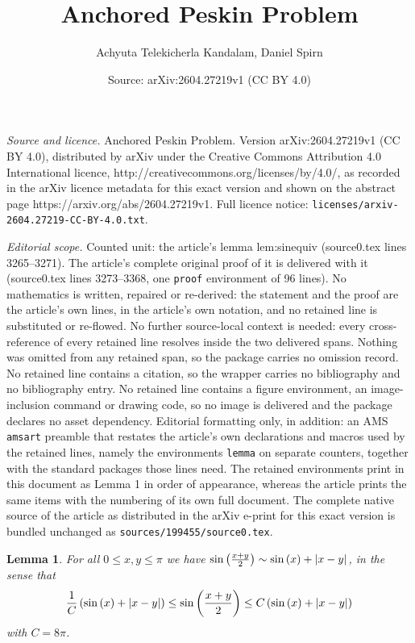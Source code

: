 \documentclass[10pt,a4paper]{amsart}
\title{Anchored Peskin Problem}
\author{Achyuta Telekicherla Kandalam, Daniel Spirn}
\date{Source: arXiv:2604.27219v1 (CC BY 4.0)}
\newtheorem{lemma}{Lemma}
\begin{document}
\maketitle

\noindent\emph{Source and licence.} Anchored Peskin Problem. Version arXiv:2604.27219v1 (CC BY 4.0), distributed by arXiv under the Creative Commons Attribution 4.0 International licence, http://creativecommons.org/licenses/by/4.0/, as recorded in the arXiv licence metadata for this exact version and shown on the abstract page https://arxiv.org/abs/2604.27219v1. Full licence notice: \texttt{licenses/arxiv-2604.27219-CC-BY-4.0.txt}.\par\smallskip

\noindent\textit{Editorial scope.} Counted unit: the article's lemma lem:sinequiv (source0.tex lines 3265--3271). The article's complete original proof of it is delivered with it (source0.tex lines 3273--3368, one \texttt{proof} environment of 96 lines). No mathematics is written, repaired or re-derived: the statement and the proof are the article's own lines, in the article's own notation, and no retained line is substituted or re-flowed.  No further source-local context is needed: every cross-reference of every retained line resolves inside the two delivered spans.  Nothing was omitted from any retained span, so the package carries no omission record.  No retained line contains a citation, so the wrapper carries no bibliography and no bibliography entry.  No retained line contains a figure environment, an image-inclusion command or drawing code, so no image is delivered and the package declares no asset dependency.  Editorial formatting only, in addition: an AMS \texttt{amsart} preamble that restates the article's own declarations and macros used by the retained lines, namely the environments \texttt{lemma} on separate counters, together with the standard packages those lines need.  The retained environments print in this document as Lemma 1 in order of appearance, whereas the article prints the same items with the numbering of its own full document.  The complete native source of the article as distributed in the arXiv e-print for this exact version is bundled unchanged as \texttt{sources/199455/source0.tex}.
\begin{lemma} \label{lem:sinequiv}
For all $0 \leq x,y \leq \pi$ we have $\sin\left( {x+y \over 2}\right) \sim  \sin\left( x \right)+ |x-y| $,  in the sense that 
\[
{1\over C}\left( \sin\left(x\right) + |x-y| \right) \leq \sin \left( {x+y \over 2}\right) \leq C \left( \sin\left( x \right)+ |x-y| \right)
\]
with $C = 8\pi$.
\end{lemma}
\end{document}
